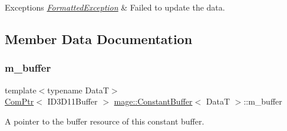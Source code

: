\begin{DoxyExceptions}{Exceptions}
{\em \hyperlink{classmage_1_1_formatted_exception}{Formatted\+Exception}} & Failed to update the data. \\
\hline
\end{DoxyExceptions}


\subsection{Member Data Documentation}
\hypertarget{structmage_1_1_constant_buffer_a394571e3102fe053f3357e2e218c0eda}{}\label{structmage_1_1_constant_buffer_a394571e3102fe053f3357e2e218c0eda} 
\subsubsection{\texorpdfstring{m\+\_\+buffer}{m\_buffer}}
{\footnotesize\ttfamily template$<$typename DataT$>$ \\
\hyperlink{namespacemage_ae74f374780900893caa5555d1031fd79}{Com\+Ptr}$<$ I\+D3\+D11\+Buffer $>$ \hyperlink{structmage_1_1_constant_buffer}{mage\+::\+Constant\+Buffer}$<$ DataT $>$\+::m\+\_\+buffer\hspace{0.3cm}{\ttfamily [private]}}

A pointer to the buffer resource of this constant buffer. 